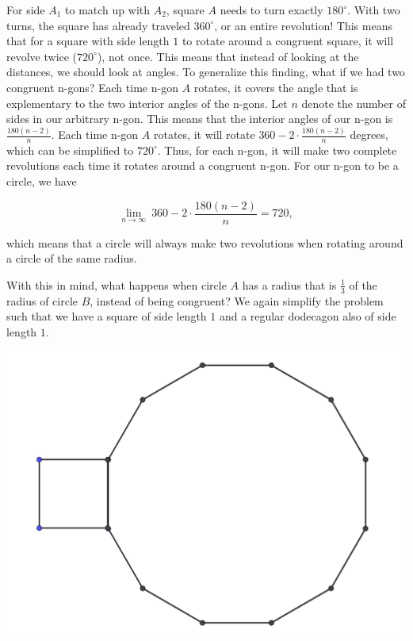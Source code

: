 \documentclass{article}
\begin{document}
For side $A_1$ to match up with $A_2$, square $A$ needs to turn exactly $180^{\circ}$. With two turns, the square has already traveled $360^{\circ}$, or an entire revolution! This means that for a square with side length $1$ to rotate around a congruent square, it will revolve twice ($720^{\circ}$), not once. This means that instead of looking at the distances, we should look at angles. To generalize this finding, what if we had two congruent n-gons? Each time n-gon $A$ rotates, it covers the angle that is explementary to the two interior angles of the n-gons. Let $n$ denote the number of sides in our arbitrary n-gon. This means that the interior angles of our n-gon is $\frac{180(n-2)}{n}$. Each time n-gon $A$ rotates, it will rotate $360 - 2 \cdot \frac{180(n-2)}{n}$ degrees, which can be simplified to $720^{\circ}$. Thus, for each n-gon, it will make two complete revolutions each time it rotates around a congruent n-gon. For our n-gon to be a circle, we have

$$\lim\limits_{n\to\infty}\ 360 - 2 \cdot \dfrac{180(n-2)}{n} = 720,$$

which means that a circle will always make two revolutions when rotating around a circle of the same radius. 

With this in mind, what happens when circle $A$ has a radius that is $\frac{1}{3}$ of the radius of circle $B$, instead of being congruent? We again simplify the problem such that we have a square of side length $1$ and a regular dodecagon also of side length $1$. 

\begin{center}
\includegraphics[scale=0.5]{images/squareanddodecagon.png}
\end{center}
\end{document}
